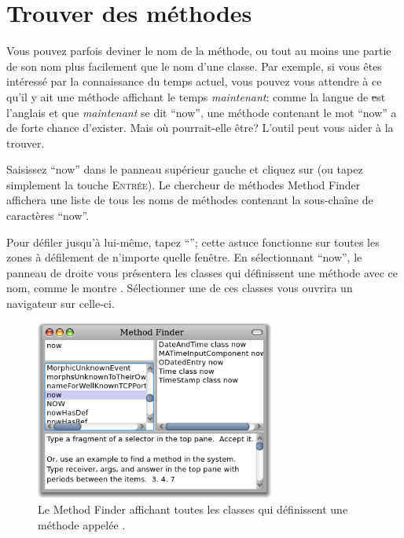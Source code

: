 \documentclass[a4paper,10pt,twoside]{book}
\begin{document}
\section{Trouver des méthodes}

Vous pouvez parfois deviner le nom de la méthode, ou tout au moins
une partie de son nom plus facilement que le nom d'une classe.
Par exemple, si vous êtes intéressé par la connaissance du temps
actuel, vous pouvez vous attendre à ce qu'il y ait 
une méthode affichant le temps \emph{maintenant}: comme la langue de \st
est l'anglais et que \emph{maintenant} se dit ``now'', une méthode
contenant le mot ``now'' a de forte chance d'exister.
Mais où pourrait-elle être?
L'outil  peut vous aider à la trouver.

Saisissez ``now'' dans le panneau supérieur gauche et cliquez sur
 (ou tapez simplement la touche \textsc{Entrée}).
Le chercheur de méthodes Method Finder affichera une liste de tous
les noms de méthodes contenant la sous-chaîne de caractères ``now''.  

Pour défiler jusqu'à  lui-même, tapez \mbox{``'';} cette
astuce fonctionne sur toutes les zones à défilement de n'importe
quelle fenêtre. En sélectionnant ``now'', le panneau de droite
vous présentera les classes qui définissent une méthode
avec ce nom, comme le montre .
Sélectionner une de ces classes vous ouvrira un navigateur sur
celle-ci.

\begin{figure}[hbt]
\centerline {\includegraphics[width=0.7\textwidth]{methodFinder-now}}
\caption{Le Method Finder affichant toutes les classes qui
  définissent une méthode appelée \mbox{.}
}
\end{figure}
\end{document}
